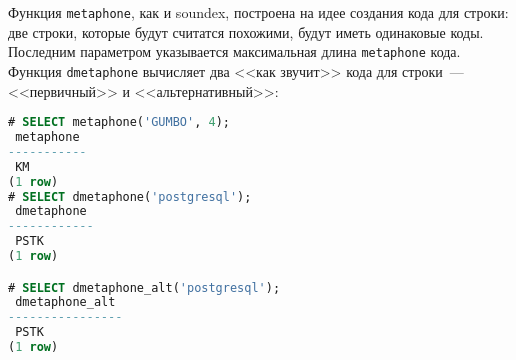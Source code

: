Функция \lstinline!metaphone!, как и soundex, построена на идее создания кода для строки: две строки, которые будут считатся похожими, будут иметь одинаковые коды. Последним параметром указывается максимальная длина \lstinline!metaphone! кода. Функция \lstinline!dmetaphone! вычисляет два <<как звучит>> кода для строки~--- <<первичный>> и <<альтернативный>>:

\begin{lstlisting}[language=SQL,label=lst:ext_fuzzystrmatch3,caption=metaphone]
# SELECT metaphone('GUMBO', 4);
 metaphone
-----------
 KM
(1 row)
# SELECT dmetaphone('postgresql');
 dmetaphone
------------
 PSTK
(1 row)

# SELECT dmetaphone_alt('postgresql');
 dmetaphone_alt
----------------
 PSTK
(1 row)
\end{lstlisting}

